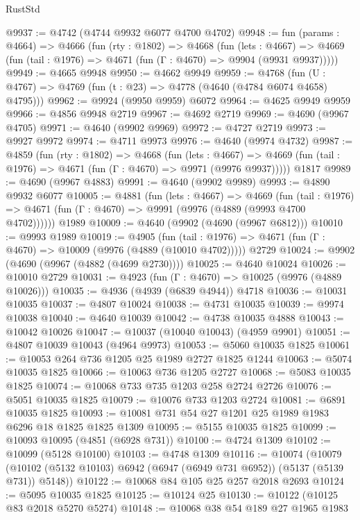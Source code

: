 \begin{lexlean}{RustStd}
\begin{coremodule}
@9937 := @4742 (@4744 @9932 @6077 @4700 @4702)
@9948 := fun (params : @4664) =>
  @4666
    (fun (rty : @1802) =>
    @4668
      (fun (lets : @4667) =>
      @4669 (fun (tail : @1976) => @4671 (fun (Γ : @4670) => @9904 (@9931 @9937)))))
@9949 := @4665 @9948
@9950 := @4662 @9949
@9959 := @4768 (fun (U : @4767) => @4769 (fun (t : @23) => @4778 (@4640 (@4784 @6074 @4658) @4795)))
@9962 := @9924 (@9950 @9959) @6072
@9964 := @4625 @9949 @9959
@9966 := @4856 @9948 @2719
@9967 := @4692 @2719
@9969 := @4690 (@9967 @4705)
@9971 := @4640 (@9902 @9969)
@9972 := @4727 @2719
@9973 := @9927 @9972
@9974 := @4711 @9973
@9976 := @4640 (@9974 @4732)
@9987 := @4859
    (fun (rty : @1802) =>
    @4668
      (fun (lets : @4667) =>
      @4669 (fun (tail : @1976) => @4671 (fun (Γ : @4670) => @9971 (@9976 @9937)))))
    @1817
@9989 := @4690 (@9967 @4883)
@9991 := @4640 (@9902 @9989)
@9993 := @4890 @9932 @6077
@10005 := @4881
    (fun (lets : @4667) =>
    @4669
      (fun (tail : @1976) => @4671 (fun (Γ : @4670) => @9991 (@9976 (@4889 (@9993 @4700 @4702))))))
    @1989
@10009 := @4640 (@9902 (@4690 (@9967 @6812)))
@10010 := @9993 @1989
@10019 := @4905
    (fun (tail : @1976) => @4671 (fun (Γ : @4670) => @10009 (@9976 (@4889 (@10010 @4702)))))
    @2729
@10024 := @9902 (@4690 (@9967 (@4882 (@4699 @2730))))
@10025 := @4640 @10024
@10026 := @10010 @2729
@10031 := @4923 (fun (Γ : @4670) => @10025 (@9976 (@4889 @10026)))
@10035 := @4936 (@4939 (@6839 @4944)) @4718
@10036 := @10031 @10035
@10037 := @4807 @10024
@10038 := @4731 @10035
@10039 := @9974 @10038
@10040 := @4640 @10039
@10042 := @4738 @10035 @4888
@10043 := @10042 @10026
@10047 := @10037 (@10040 @10043) (@4959 @9901)
@10051 := @4807 @10039 @10043 (@4964 @9973)
@10053 := @5060 @10035 @1825
@10061 := @10053 @264 @736 @1205 @25 @1989 @2727 @1825 @1244
@10063 := @5074 @10035 @1825
@10066 := @10063 @736 @1205 @2727
@10068 := @5083 @10035 @1825
@10074 := @10068 @733 @735 @1203 @258 @2724 @2726
@10076 := @5051 @10035 @1825
@10079 := @10076 @733 @1203 @2724
@10081 := @6891 @10035 @1825
@10093 := @10081 @731 @54 @27 @1201 @25 @1989 @1983 @6296 @18 @1825 @1825 @1309
@10095 := @5155 @10035 @1825
@10099 := @10093 @10095 (@4851 (@6928 @731))
@10100 := @4724 @1309
@10102 := @10099 (@5128 @10100)
@10103 := @4748 @1309
@10116 := @10074
    (@10079 (@10102 (@5132 @10103) @6942 (@6947 (@6949 @731 @6952)) (@5137 (@5139 @731)) @5148))
@10122 := @10068 @84 @105 @25 @257 @2018 @2693
@10124 := @5095 @10035 @1825
@10125 := @10124 @25
@10130 := @10122 (@10125 @83 @2018 @5270 @5274)
@10148 := @10068
    @38
    @54
    @189
    @27
    @1965
    @1983

\end{coremodule}
\end{lexlean}
